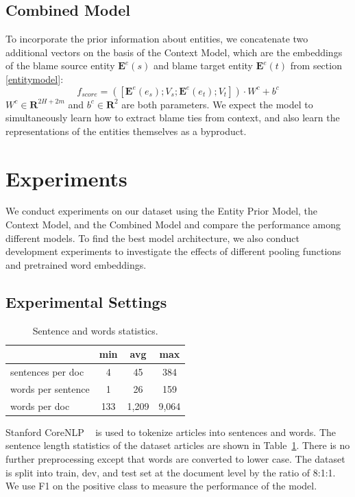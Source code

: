 \documentclass[letterpaper]{article} %
\begin{document}
\subsection{Combined Model}

To incorporate the prior information about entities, we concatenate two additional vectors on the basis of the Context Model, which are the embeddings of the blame source entity $\mathbf{E}^e(s)$ and blame target entity $\mathbf{E}^e(t)$ from section \ref{entitymodel}: $$f_{score} = ([\mathbf{E}^e(e_s); V_s; \mathbf{E}^e(e_t); V_t]) \cdot W^c + b^c $$ $W^c \in \mathbf{R}^{2H + 2m}$ and $b^c \in \mathbf{R}^{2}$ are both parameters. We expect the model to simultaneously learn how to extract blame ties from context, and also learn the representations of the entities themselves as a byproduct.

\section{Experiments}
\label{experiment}

We conduct experiments on our dataset using the Entity Prior Model, the Context Model, and the Combined Model and compare the performance among different models. To find the best model architecture, we also conduct development experiments to investigate the effects of different pooling functions and pretrained word embeddings.

\subsection{Experimental Settings}

\begin{table}[t!]
\centering
\begin{tabular}{l c c c}
 \hline
 &{\bf min} & {\bf avg}  &{\bf max} \\
 \hline\hline
sentences per doc & 4 & 45 & 384 \\
words per sentence & 1 & 26 & 159 \\
words per doc & 133 & 1,209 & 9,064 \\
 \hline
\end{tabular}
\caption{Sentence and words statistics.}
\label{table:lengthstatistic}
\end{table}

Stanford CoreNLP ~\cite{manning-EtAl:2014:P14-5} is used to tokenize articles into sentences and words. The sentence length statistics of the dataset articles are shown in Table~\ref{table:lengthstatistic}. There is no further preprocessing except that words are converted to lower case. The dataset is split into train, dev, and test set at the document level by the ratio of 8:1:1. We use F1 on the positive class to measure the performance of the model.
\end{document}

